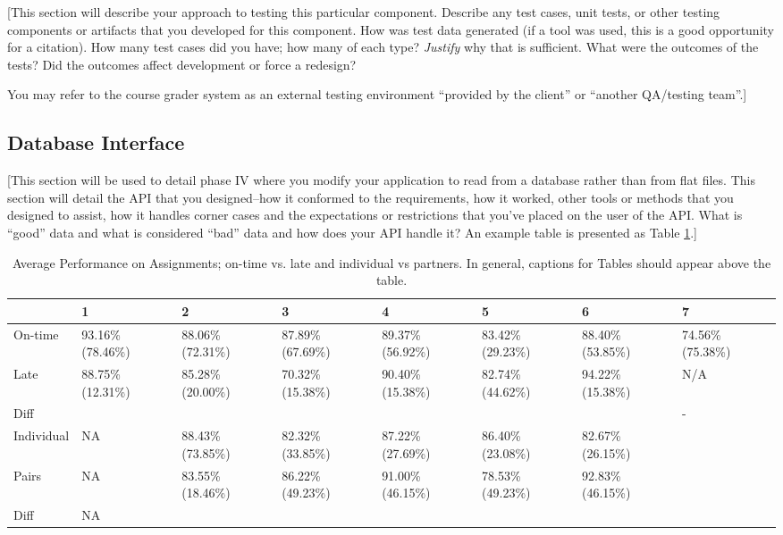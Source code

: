 \documentclass[12pt]{scrartcl} %
\begin{document}
[This section will describe your approach to testing this particular 
component.  Describe any test cases, unit tests, or other testing 
components or artifacts that you developed for this component.  How
was test data generated (if a tool was used, this is a good opportunity
for a citation).  How many test cases did you have; how many of each type?  
\emph{Justify} why that is sufficient.  What were the outcomes of the tests?
Did the outcomes affect development or force a redesign?

You may refer to the course grader system as an external testing 
environment ``provided by the client'' or ``another QA/testing team''.]

\subsection{Database Interface}

[This section will be used to detail phase IV where you modify your 
application to read from a database rather than from flat files.  
This section will detail the API that you designed--how it conformed 
to the requirements, how it worked, other tools or methods that you 
designed to assist, how it handles corner cases and the expectations 
or restrictions that you've placed on the user of the API.  What is
``good'' data and what is considered ``bad'' data and how does your
API handle it?  An example table is presented as Table 
\ref{table:assignmentPerformance}.]

\begin{table}[h] %
\centering
\caption{Average Performance on Assignments; on-time vs. late and individual vs partners.  In general, captions for Tables should appear above the table.}
\label{table:assignmentPerformance}
\begin{tabular}{|l|p{1.5cm}|p{1.5cm}|p{1.5cm}|p{1.5cm}|p{1.5cm}|p{1.5cm}|p{1.5cm}|}
\hline
~ & 1 & 2 & 3 & 4 & 5 & 6 & 7 \\
\hline
On-time	& 93.16\% (78.46\%)	& 88.06\% (72.31\%)	& 87.89\% (67.69\%)	& 89.37\% (56.92\%) & 83.42\% (29.23\%) & 88.40\% (53.85\%) & 74.56\% (75.38\%) \\
\hline
Late & 88.75\% (12.31\%) & 85.28\% (20.00\%) & 70.32\% (15.38\%) & 90.40\% (15.38\%) & 82.74\% (44.62\%) & 94.22\% (15.38\%) & N/A \\
\hline
Diff & \color{red}{4.42\%} & \color{red}{2.79\%} & \color{red}{17.57\%} & \color{green}{1.03\%} & \color{red}{0.68\%} & \color{green}{5.82\%} & - \\
\hline
Individual & NA	& 88.43\% (73.85\%) & 82.32\% (33.85\%) & 87.22\% (27.69\%) & 86.40\% (23.08\%) & 82.67\% (26.15\%) & ~\\
\hline
Pairs & NA & 83.55\% (18.46\%) & 86.22\% (49.23\%) & 91.00\% (46.15\%) & 78.53\% (49.23\%) & 92.83\% (46.15\%) & ~\\
\hline
Diff & NA & \color{red}{4.88\%} & \color{green}{3.90\%} & \color{green}{3.78\%} & \color{red}{7.87\%} & \color{green}{10.16\%}	& ~\\
\hline
\end{tabular}
\end{table}
\end{document}
